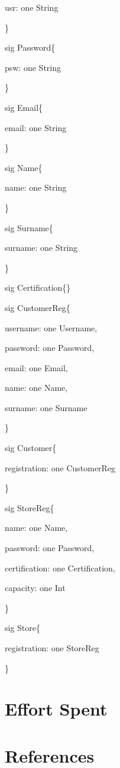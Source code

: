 \documentclass{article}
\begin{document}
		usr: one String
		
	\}
	
	
	sig Password\{
		
		psw: one String
		
	\}


	sig Email\{
	
		email: one String
		
	\}
	
	sig Name\{
	
		name: one String
		
	\}
	
	sig Surname\{
	
		surname: one String
		
	\}

	sig Certification\{\}
	
	sig CustomerReg\{
	
		username: one Username,
		
		password: one Password,
		
		email: one Email,
		
		name: one Name,
		
		surname: one Surname
		
	\}

	sig Customer\{
	
		registration: one CustomerReg
		
	\}

	sig StoreReg\{
	
		name: one Name,
		
		password: one Password,
		
		certification: one Certification,
		
		capacity: one Int		
		
	\}
	
	sig Store\{
	
		registration: one StoreReg
		
	\}
	
	
	
	
\section{Effort Spent}

\section{References}	
	
	
	
\end{document}
